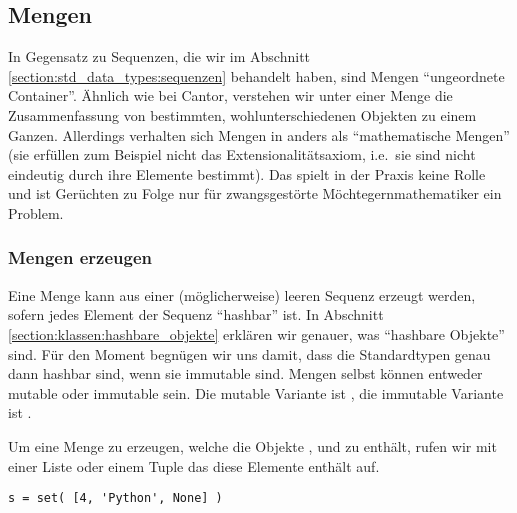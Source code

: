 \subsection{Mengen}
\label{section:std_data_types:mengen}
In Gegensatz zu Sequenzen, die wir im Abschnitt \ref{section:std_data_types:sequenzen} behandelt haben, sind Mengen ``ungeordnete Container''.
Ähnlich wie bei Cantor, verstehen wir unter einer Menge die Zusammenfassung von bestimmten, wohlunterschiedenen Objekten zu einem Ganzen.
Allerdings verhalten sich Mengen in \Python anders als ``mathematische Mengen'' (sie erfüllen zum Beispiel nicht das Extensionalitätsaxiom, i.e.\ sie sind nicht eindeutig durch ihre Elemente bestimmt).
Das spielt in der Praxis keine Rolle und ist Gerüchten zu Folge nur für zwangsgestörte Möchtegernmathematiker ein Problem.


\subsubsection{Mengen erzeugen}
\label{section:std_data_types:mengen:mengen_erzeugen}
Eine Menge kann aus einer (möglicherweise) leeren Sequenz erzeugt werden, sofern jedes Element der Sequenz ``hashbar'' ist.
In Abschnitt \ref{section:klassen:hashbare_objekte} erklären wir genauer, was ``hashbare Objekte'' sind.
Für den Moment begnügen wir uns damit, dass die Standardtypen genau dann hashbar sind, wenn sie immutable sind.
Mengen selbst können entweder mutable oder immutable sein.
Die mutable Variante ist , die immutable Variante ist .

Um eine Menge zu erzeugen, welche die Objekte ,  und  zu enthält, rufen wir  mit einer Liste oder einem Tuple das diese Elemente enthält auf.
\begin{lstlisting}
s = set( [4, 'Python', None] )
\end{lstlisting}


